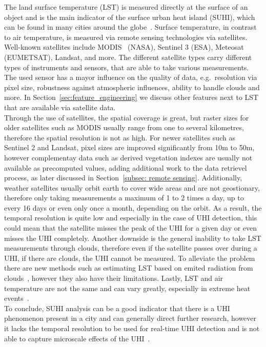 The land surface temperature (LST) is measured directly at the surface of an object and is the main indicator of the surface urban heat island (SUHI), which can be found in many cities around the globe~\cite{peng2012surface}. Surface temperature, in contrast to air temperature, is measured via remote sensing technologies via satellites. Well-known satellites include MODIS~\cite{didan2021modis} (NASA), Sentinel 3 (ESA), Meteosat (EUMETSAT), Landsat, and more. The different satellite types carry different types of instruments and sensors, that are able to take various measurements. The used sensor has a mayor influence on the quality of data, e.g.\ resolution via pixel size, robustness against atmospheric influences, ability to handle clouds and more. In Section~\ref{sec:feature_engineering} we discuss other features next to LST that are available via satellite data.\\
Through the use of satellites, the spatial coverage is great, but raster sizes for older satellites such as MODIS usually range from one to several kilometres, therefore the spatial resolution is not as high. For newer satellites such as Sentinel 2 and Landsat, pixel sizes are improved significantly from 10m to 50m, however complementay data such as derived vegetation indexes are usually not available as precomputed values, adding additional work to the data retrievel process, as later discussed in Section~\ref{subsec: remote sensing}.
Additionally, weather satellites usually orbit earth to cover wide areas and are not geostionary, therefore only taking measurements a maximum of 1 to 2 times a day, up to every 16 days or even only once a month, depending on the orbit. As a result, the temporal resolution is quite low and especially in the case of UHI detection, this could mean that the satellite misses the peak of the UHI for a given day or even misses the UHI completely. Another downside is the general inability to take LST measurements through clouds, therefore even if the satellite passes over during a UHI, if there are clouds, the UHI cannot be measured. To alleviate the problem there are new methods such as estimating LST based on emited radiation from clouds~\cite{zhang2015estimation}, however they also have their limitations. Lastly, LST and air temperature are not the same and can vary greatly, especially in extreme heat events~\cite{good2016situ}.\\
To conclude, SUHI analysis can be a good indicator that there is a UHI phenomenon present in a city and can generally direct further research, however it lacks the temporal resolution to be used for real-time UHI detection and is not able to capture microscale effects of the UHI~\cite{voogt2003thermal, voelkel2017towards}.

